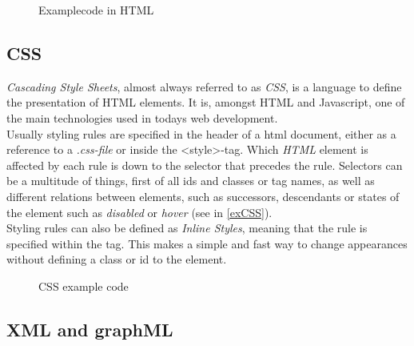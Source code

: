 \begin{figure}[!h]

\caption{Examplecode in HTML}
\label{exHTML}
\end{figure}

\subsection{CSS}
\textit{Cascading Style Sheets}, almost always referred to as \textit{CSS}, is a language to define the presentation of HTML elements. It is, amongst HTML and Javascript, one of the main technologies used in todays web development.\\
Usually styling rules are specified in the header of a html document, either as a reference to a \textit{.css-file} or inside the \textless  style\textgreater-tag. Which \textit{HTML} element is affected by each rule is down to the selector that precedes the rule. Selectors can be a multitude of things, first of all ids and classes or tag names, as well as different relations between elements, such as successors, descendants or states of the element such as \textit{disabled} or \textit{hover} (see in \autoref{exCSS}).\\
Styling rules can also be defined as \textit{Inline Styles}, meaning that the rule is specified within the tag. This makes a simple and fast way to change appearances without defining a class or id to the element.

\begin{figure}[!h]

\caption{CSS example code}
\label{exCSS}
\end{figure}

\subsection{XML and graphML}

